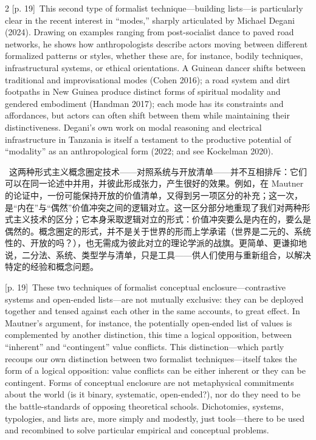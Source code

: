 \documentclass[10pt,a4paper]{article}
\begin{document}
\begin{paracol}{2}
{\scriptsize\color{gray} [p. 19]}\ This second type of formalist technique—building lists—is particularly clear in the recent interest in “modes,” sharply articulated by Michael Degani (2024). Drawing on examples ranging from post-socialist dance to paved road networks, he shows how anthropologists describe actors moving between different formalized patterns or styles, whether these are, for instance, bodily techniques, infrastructural systems, or ethical orientations. A Guinean dancer shifts between traditional and improvisational modes (Cohen 2016); a road system and dirt footpaths in New Guinea produce distinct forms of spiritual modality and gendered embodiment (Handman 2017); each mode has its constraints and affordances, but actors can often shift between them while maintaining their distinctiveness. Degani’s own work on modal reasoning and electrical infrastructure in Tanzania is itself a testament to the productive potential of “modality” as an anthropological form (2022; and see Kockelman 2020).\par
\switchcolumn*
{\scriptsize\color{gray} [p. 19]}\ 这两种形式主义概念圈定技术——对照系统与开放清单——并不互相排斥：它们可以在同一论述中并用，并彼此形成张力，产生很好的效果。例如，在 Mautner 的论证中，一份可能保持开放的价值清单，又得到另一项区分的补充；这一次，是“内在”与“偶然”价值冲突之间的逻辑对立。这一区分部分地重现了我们对两种形式主义技术的区分；它本身采取逻辑对立的形式：价值冲突要么是内在的，要么是偶然的。概念圈定的形式，并不是关于世界的形而上学承诺（世界是二元的、系统性的、开放的吗？），也无需成为彼此对立的理论学派的战旗。更简单、更谦抑地说，二分法、系统、类型学与清单，只是工具——供人们使用与重新组合，以解决特定的经验和概念问题。\par
\switchcolumn
{\scriptsize\color{gray} [p. 19]}\ These two techniques of formalist conceptual enclosure—contrastive systems and open-ended lists—are not mutually exclusive: they can be deployed together and tensed against each other in the same accounts, to great effect. In Mautner’s argument, for instance, the potentially open-ended list of values is complemented by another distinction, this time a logical opposition, between “inherent” and “contingent” value conflicts. This distinction—which partly recoups our own distinction between two formalist techniques—itself takes the form of a logical opposition: value conflicts can be either inherent or they can be contingent. Forms of conceptual enclosure are not metaphysical commitments about the world (is it binary, systematic, open-ended?), nor do they need to be the battle-standards of opposing theoretical schools. Dichotomies, systems, typologies, and lists are, more simply and modestly, just tools—there to be used and recombined to solve particular empirical and conceptual problems.\par
\switchcolumn*
\end{paracol}
\end{document}
